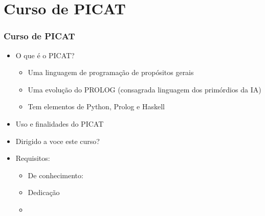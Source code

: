 \section{Curso de PICAT}

\begin{frame}[fragile]
  \frametitle{Curso de PICAT}
  \begin{itemize}

    \item O que é o PICAT?
    \pause
       \begin{itemize}
			\item Uma linguagem de programação de propósitos gerais
			\item Uma evolução do PROLOG (consagrada linguagem dos primórdios da IA)
			\item Tem elementos de Python, Prolog e Haskell
		\end{itemize}


    \item Uso e finalidades do PICAT
    \pause
    \item Dirigido a voce este curso?
    \pause
    \item Requisitos:
    \pause
		\begin{itemize}
			\item De conhecimento:
			\item Dedicação
			\item 
		\end{itemize}


  \end{itemize}

\end{frame}
